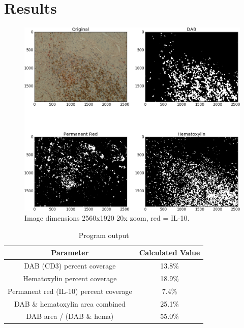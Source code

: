 \documentclass[12pt]{article}
\begin{document}
\section*{Results}


\begin{figure}[H]
  \includegraphics[width=\linewidth]{9_IL10_20x.png}
  \caption{Image dimensions 2560x1920
20x zoom, red = IL-10.}
  \label{fig:9 IL10}
\end{figure}


\begin{table}[H]
\centering
\caption{Program output}
\label{program output}
\begin{tabular}{|c|c|}
\hline
\textbf{Parameter} & \textbf{Calculated Value} \\ \hline
DAB (CD3) percent coverage & 13.8\% \\ \hline
Hematoxylin percent coverage & 18.9\% \\ \hline
Permanent red (IL-10) percent coverage & 7.4\% \\ \hline
DAB \& hematoxylin area combined & 25.1\% \\ \hline
DAB area / (DAB \& hema) & 55.0\% \\ \hline
\end{tabular}
\end{table}

\end{document}
